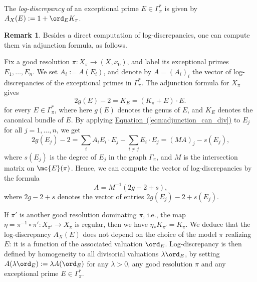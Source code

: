 \documentclass[11 pt, twoside, a4paper]{amsart}
\newcommand{\dgvert}[1]{\varGamma_{#1}^*}
\newcommand{\dgraph}[1]{\varGamma_{#1}}
\newcommand{\Kld}{{A}}
\newcommand{\Div}{\on{Div}}
\theoremstyle{definition}
\newtheorem{rem}[thm]{Remark}
\theoremstyle{definition}
\newcommand{\Ediv}[2][]{\mc{E}(#2)_{#1}}
\newcommand{\refeqn}[1]{\hyperref[eqn:#1]{Equation~(\ref*{eqn:#1})}}
\begin{document}
The \emph{log-discrepancy} of an exceptional prime $E \in \dgvert{\pi}$ is given by $\Kld_X(E):=1+\ord_E K_\pi$.
\begin{rem}
Besides a direct computation of log-discrepancies, one can compute them via adjunction formula, as follows.

Fix a good resolution $\pi \colon X_\pi \to (X,x_0)$, and label its exceptional primes $E_1, \ldots, E_n$.
We set $\Kld_i:=\Kld(E_i)$, and denote by $\Kld=(\Kld_i)_i$ the vector of log-discrepancies of the exceptional primes in $\dgvert{\pi}$.
The adjunction formula for $X_\pi$ gives
\begin{equation}\label{eqn:adjunction_can_div}
2g(E)-2 = K_{E} = (K_\pi + E) \cdot E\text{.}
\end{equation}
for every $E \in \dgvert{\pi}$,
where here $g(E)$ denotes the genus of $E$, and $K_E$ denotes the canonical bundle of $E$.
By applying \refeqn{adjunction_can_div} to $E_j$ for all $j=1,\ldots, n$, we get
\[
2g(E_j)-2 = \sum_{i} \Kld_i E_i \cdot E_j - \sum_{i \neq j} E_i \cdot E_j = (M\Kld)_j - s(E_j)\text{,} 
\]
where $s(E_j)$ is the degree of $E_j$ in the graph $\dgraph{\pi}$, and $M$ is the intersection matrix on $\Ediv{\pi}$.
Hence, we can compute the vector of log-discrepancies by the formula
\begin{equation}\label{eqn:computeldadj}
\Kld=M^{-1}(2g-2+s)\text{,}
\end{equation}
where $2g-2+s$ denotes the vector of entries $2g(E_j)-2+s(E_j)$.
\end{rem}

If $\pi'$ is another good resolution dominating $\pi$, i.e., the map $\eta=\pi^{-1} \circ \pi' \colon X_{\pi'} \to X_\pi$ is regular, then we have $\eta_* K_{\pi'} = K_\pi$.
We deduce that the log-discrepancy $\Kld_X(E)$ does not depend on the choice of the model $\pi$ realizing $E$: it is a function of the associated valuation $\ord_E$. 
Log-discrepancy is then defined by homogeneity to all divisorial valuations $\lambda \ord_{E}$, by setting $\Kld(\lambda \ord_{E}):=\lambda \Kld(\ord_{E})$ for any $\lambda > 0$, any good resolution $\pi$ and any exceptional prime $E \in \dgvert{\pi}$.
\end{document}
